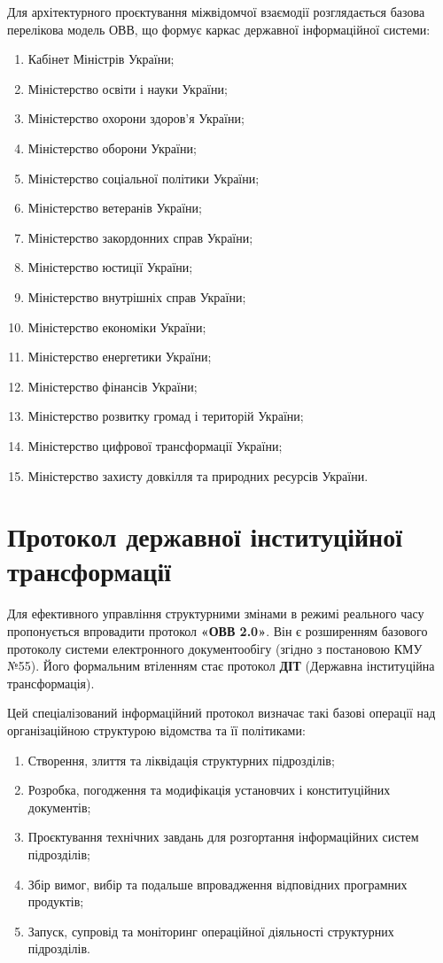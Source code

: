 Для архітектурного проєктування міжвідомчої взаємодії розглядається базова перелікова модель ОВВ, що формує каркас державної інформаційної системи:

\begin{enumerate}
    \item Кабінет Міністрів України;
    \item Міністерство освіти і науки України;
    \item Міністерство охорони здоров'я України;
    \item Міністерство оборони України;
    \item Міністерство соціальної політики України;
    \item Міністерство ветеранів України;
    \item Міністерство закордонних справ України;
    \item Міністерство юстиції України;
    \item Міністерство внутрішніх справ України;
    \item Міністерство економіки України;
    \item Міністерство енергетики України;
    \item Міністерство фінансів України;
    \item Міністерство розвитку громад і територій України;
    \item Міністерство цифрової трансформації України;
    \item Міністерство захисту довкілля та природних ресурсів України.
\end{enumerate}

\newpage
\section{Протокол державної інституційної трансформації}

Для ефективного управління структурними змінами в режимі реального часу пропонується впровадити протокол \textbf{«ОВВ 2.0»}. Він є розширенням базового протоколу системи електронного документообігу (згідно з постановою КМУ №55). Його формальним втіленням стає протокол \textbf{ДІТ} (Державна інституційна трансформація).

Цей спеціалізований інформаційний протокол визначає такі базові операції над організаційною структурою відомства та її політиками:

\begin{enumerate}
    \item Створення, злиття та ліквідація структурних підрозділів;
    \item Розробка, погодження та модифікація установчих і конституційних документів;
    \item Проєктування технічних завдань для розгортання інформаційних систем підрозділів;
    \item Збір вимог, вибір та подальше впровадження відповідних програмних продуктів;
    \item Запуск, супровід та моніторинг операційної діяльності структурних підрозділів.
\end{enumerate}

